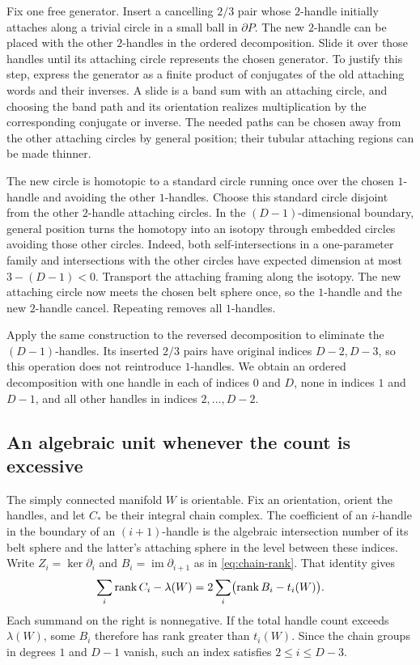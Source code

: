 Fix one free generator.  Insert a cancelling $2/3$ pair whose
$2$-handle initially attaches along a trivial circle in a small ball in
$\partial P$.  The new $2$-handle can be placed with the other
$2$-handles in the ordered decomposition.  Slide it over those handles
until its attaching circle represents the chosen generator.  To justify
this step, express the generator as a finite product of conjugates of
the old attaching words and their inverses.  A slide is a band sum
with an attaching circle, and choosing the band path and its orientation
realizes multiplication by the corresponding conjugate or inverse.
The needed paths can be chosen away from the other attaching circles by
general position; their tubular attaching regions can be made thinner.

The new circle is homotopic to a standard circle running once over the
chosen $1$-handle and avoiding the other $1$-handles.  Choose this standard
circle disjoint from the other $2$-handle attaching circles.  In the
$(D-1)$-dimensional boundary, general position turns the homotopy into an
isotopy through embedded circles avoiding those other circles.  Indeed,
both self-intersections in a one-parameter family and intersections with
the other circles have expected dimension at most $3-(D-1)<0$.
Transport the attaching framing along the isotopy.  The new attaching
circle now meets the chosen belt sphere once, so the $1$-handle and the
new $2$-handle cancel.  Repeating removes all $1$-handles.

Apply the same construction to the reversed decomposition to eliminate
the $(D-1)$-handles.  Its inserted $2/3$ pairs have original indices
$D-2,D-3$, so this operation does not reintroduce $1$-handles.  We
obtain an ordered decomposition with one handle in each of indices $0$
and $D$, none in indices $1$ and $D-1$, and all other handles in indices
$2,\ldots,D-2$.

\subsection{An algebraic unit whenever the count is excessive}

The simply connected manifold $W$ is orientable.  Fix an orientation,
orient the handles, and let $C_*$ be their integral chain complex.  The
coefficient of an $i$-handle in the boundary of an $(i+1)$-handle is the
algebraic intersection number of its belt sphere and the latter's
attaching sphere in the level between these indices.  Write
$Z_i=\ker\partial_i$ and $B_i=\operatorname{im}\partial_{i+1}$ as in
\eqref{eq:chain-rank}.  That identity gives
\begin{equation}\label{eq:handle-excess}
 \sum_i\operatorname{rank} C_i-\lambda(W)
 =2\sum_i\bigl(\operatorname{rank} B_i-t_i(W)\bigr).
\end{equation}
Each summand on the right is nonnegative.  If the total handle count
exceeds $\lambda(W)$, some $B_i$ therefore has rank greater than
$t_i(W)$.  Since the chain groups in degrees $1$ and $D-1$ vanish,
such an index satisfies $2\leq i\leq D-3$.

